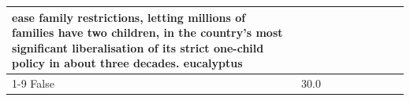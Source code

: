 \begin{table}[H]
\begin{tabular}{lllrlllll}
ease family restrictions, letting millions of families have two children, in the country's most significant liberalisation of its strict one-child policy in about three decades. eucalyptus \\
\cline{1-9}
False & 30.0%
\end{tabular}
\end{table}
